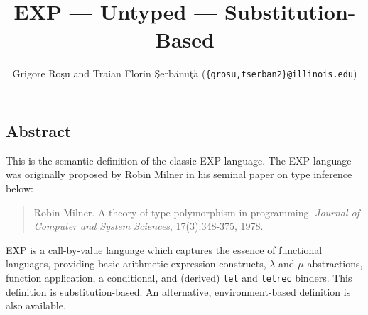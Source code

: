 \setlength{\parindent}{1em}
\title{EXP --- Untyped --- Substitution-Based}
\author{Grigore Ro\c{s}u and
        Traian Florin \c{S}erb\u{a}nu\c{t}\u{a}
	(\texttt{\{grosu,tserban2\}@illinois.edu})}

\maketitle

\begin{kblock}[text]
\section{Abstract}
This is the \K semantic definition of the classic EXP language.
The EXP language was originally proposed by Robin Milner in his
seminal paper on type inference below:
\begin{quote}
Robin Milner. A theory of type polymorphism in programming.
{\em Journal of Computer and System Sciences}, 17(3):348-375, 1978.
\end{quote}
EXP is a call-by-value language which captures the essence of
functional languages, providing basic arithmetic expression
constructs, $\lambda$ and $\mu$ abstractions, function application, a
conditional, and (derived) \texttt{let} and \texttt{letrec} binders.
This definition is substitution-based. An alternative,
environment-based \K definition is also available.
\end{kblock}

\vspace*{3ex}
